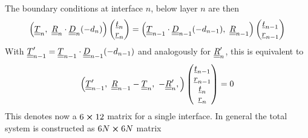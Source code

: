 The boundary conditions at interface $n$, below layer $n$ are then
\begin{equation}
    \left(\uuline{T}_n,\ \uuline{R}_n\cdot \uuline{D}_n(-d_{n}) \right)
    \begin{pmatrix} \uline{t}_n \\ \uline{r}_n \end{pmatrix} =
    \left( \uuline{T}_{n-1} \cdot \uuline{D}_{n-1}(-d_{n-1}),\
    \uuline{R}_{n-1} \right)
    \begin{pmatrix} \uline{t}_{n-1} \\ \uline{r}_{n-1} \end{pmatrix}
\end{equation}
With $\underline{\underline{T}}_{n-1}^\prime = \underline{\underline{T}}_{n-1} \cdot
    \underline{\underline{D}}_{n-1}(-d_{n-1})$ and analogously for $\underline{\underline{R}}_n^\prime$, this
is equivalent to
\begin{equation}
    \left(\uuline{T}_{n-1}^\prime,\ \uuline{R}_{n-1}
    -\uuline{T}_n,\ -\uuline{R}_n^\prime,\right)
    \begin{pmatrix} \uline{t}_{n-1} \\ \uline{r}_{n-1} \\  \uline{t}_n \\
        \uline{r}_n\end{pmatrix} = 0
\end{equation}
This denotes now a $6\cross 12$ matrix for a single interface. In general the
total
system is constructed as $6N \cross 6N$ matrix
